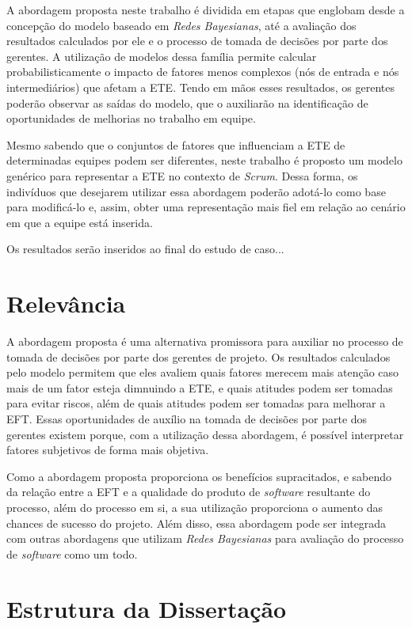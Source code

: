 A abordagem proposta neste trabalho é dividida em etapas que englobam desde a concepção do modelo baseado em \textit{Redes Bayesianas}, até a avaliação dos resultados calculados por ele e o processo de tomada de decisões por parte dos gerentes. A utilização de modelos dessa família permite calcular probabilisticamente o impacto de fatores menos complexos (nós de entrada e nós intermediários) que afetam a ETE. Tendo em mãos esses resultados, os gerentes poderão observar as saídas do modelo, que o auxiliarão na identificação de oportunidades de melhorias no trabalho em equipe.

Mesmo sabendo que o conjuntos de fatores que influenciam a ETE de determinadas equipes podem ser diferentes, neste trabalho é proposto um modelo genérico para representar a ETE no contexto de \textit{Scrum}. Dessa forma, os indivíduos que desejarem utilizar essa abordagem poderão adotá-lo como base para modificá-lo e, assim, obter uma representação mais fiel em relação ao cenário em que a equipe está inserida.

{\color{red} Os resultados serão inseridos ao final do estudo de caso...}

\section{Relevância}
\label{introducao:relevancia}

A abordagem proposta é uma alternativa promissora para auxiliar no processo de tomada de decisões por parte dos gerentes de projeto. Os resultados calculados pelo modelo permitem que eles avaliem quais fatores merecem mais atenção caso mais de um fator esteja dimnuindo a ETE, e quais atitudes podem ser tomadas para evitar riscos, além de quais atitudes podem ser tomadas para melhorar a EFT. Essas oportunidades de auxílio na tomada de decisões por parte dos gerentes existem porque, com a utilização dessa abordagem, é possível interpretar fatores subjetivos de forma mais objetiva.

Como a abordagem proposta proporciona os benefícios supracitados, e sabendo da relação entre a EFT e a qualidade do produto de \textit{software} resultante do processo, além do processo em si, a sua utilização proporciona o aumento das chances de sucesso do projeto. Além disso, essa abordagem pode ser integrada com outras abordagens que utilizam \textit{Redes Bayesianas} para avaliação do processo de \textit{software} como um todo.

\section{Estrutura da Dissertação}
\label{introducao:estrutura}

